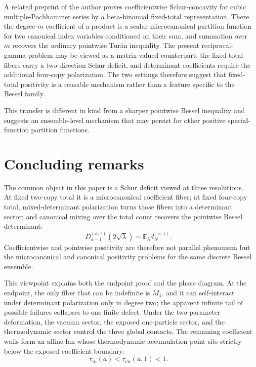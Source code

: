 \documentclass[11pt,a4paper]{amsart}
\numberwithin{equation}{section}
\theoremstyle{plain}
\theoremstyle{definition}
\newcommand{\E}{\mathbb E}
\begin{document}
A related preprint of the author \cite{Shields2026Cubic} proves
coefficientwise Schur-concavity for cubic multiple-Pochhammer series by a
beta-binomial fixed-total representation.  There the degree-\(m\)
coefficient of a product is a scalar microcanonical partition function for two
canonical index variables conditioned on their sum, and summation over \(m\)
recovers the ordinary pointwise Tur\'an inequality.  The present
reciprocal-gamma problem may be viewed as a matrix-valued counterpart: the
fixed-total fibers carry a two-direction Schur deficit, and determinant
coefficients require the additional four-copy polarization.  The two settings
therefore suggest that fixed-total positivity is a reusable mechanism rather
than a feature specific to the Bessel family.

This transfer is different in kind from a sharper pointwise Bessel inequality
and suggests an ensemble-level mechanism that may persist for other positive
special-function partition functions.

\section{Concluding remarks}\label{sec:conclusion}

The common object in this paper is a Schur deficit viewed at three resolutions.
At fixed two-copy total it is a microcanonical coefficient fiber; at fixed
four-copy total, mixed-determinant polarization turns those fibers into a
determinant sector; and canonical mixing over the total count recovers the
pointwise Bessel determinant:
\[
 D_{a-1}^{(\kappa,\tau)}(2\sqrt\lambda)=\E_\lambda d_N^{(\kappa,\tau)}.
\]
Coefficientwise and pointwise positivity are therefore not parallel phenomena
but the microcanonical and canonical positivity problems for the same discrete
Bessel ensemble.

This viewpoint explains both the endpoint proof and the phase diagram.  At the
endpoint, the only fiber that can be indefinite is \(M_1\), and it can
self-interact under determinant polarization only in degree two; the apparent
infinite tail of possible failures collapses to one finite defect.  Under the
two-parameter deformation, the vacuum sector, the exposed one-particle sector,
and the thermodynamic sector control the three global contacts.  The remaining
coefficient walls form an affine fan whose thermodynamic accumulation point
sits strictly below the exposed coefficient boundary:
\[
 \tau_\infty(a)<\tau_{\mathrm{cw}}(a,1)<1.
\]
\end{document}
